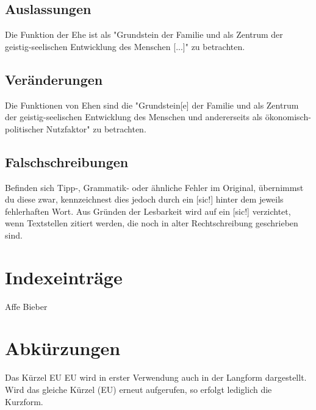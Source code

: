 \subsection{Auslassungen}
Die Funktion der Ehe ist als "Grundstein der Familie und als Zentrum der
geistig-seelischen Entwicklung des Menschen [...]"
\autocite[9]{aristotle:physics} zu betrachten.                                      %

\subsection{Ver\"anderungen}
Die Funktionen von Ehen sind die "Grundstein[e] der Familie und als Zentrum
der geistig-seelischen Entwicklung des Menschen und andererseits als
\"okonomisch-politischer Nutzfaktor" \autocite[9]{aristotle:physics} zu betrachten. %

\subsection{Falschschreibungen}
Befinden sich Tipp-, Grammatik- oder \"ahnliche Fehler im Original,
\"ubernimmst du diese zwar, kennzeichnest dies jedoch durch ein [sic!]
hinter dem jeweils fehlerhaften Wort. Aus Gr\"unden der Lesbarkeit
wird auf ein [sic!] verzichtet, wenn Textstellen zitiert werden,
die noch in alter Rechtschreibung geschrieben sind.                                 %

\section{Indexeintr\"age}
Affe
Bieber                                                                %


\section{Abk\"urzungen}                                                             
Das K\"urzel EU \ac{EU} wird in erster Verwendung auch in der Langform
dargestellt. Wird das gleiche K\"urzel (\ac{EU}) erneut aufgerufen,
so erfolgt lediglich die Kurzform.                                                  %

